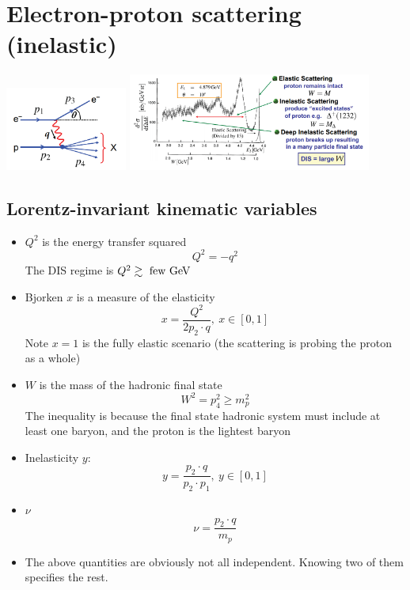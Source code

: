 \section{Electron-proton scattering (inelastic)}
\begin{center}
  \includegraphics[width=0.3\textwidth]{figs/disfeyn.png}
  \includegraphics[width=0.6\textwidth]{figs/epxsec.png}
\end{center}
\subsection{Lorentz-invariant kinematic variables}
\begin{itemize}
  \item $Q^2$ is the energy transfer squared
  \begin{equation}
    Q^2 = -q^2
  \end{equation}
  The DIS regime is $Q^2\gtrsim \text{ few}~\text{GeV}$
  \item Bjorken $x$ is a measure of the elasticity
  \begin{equation}
    x = \frac{Q^2}{2p_2\cdot q}, ~ x\in [0,1]
  \end{equation}
  Note $x=1$ is the fully elastic scenario (the scattering is probing the proton as a whole)
  \item $W$ is the mass of the hadronic final state
  \begin{equation}
    W^2 = p_4^2 \geq m_p^2
  \end{equation}
  The inequality is because the final state hadronic system must include at least one baryon, and the proton is the lightest baryon
  \item Inelasticity $y$:
  \begin{equation}
    y = \frac{p_2\cdot q}{p_2\cdot p_1}, ~ y\in [0,1]
  \end{equation}
  \item $\nu$
  \begin{equation}
    \nu = \frac{p_2\cdot q}{m_p}
  \end{equation}
  \item The above quantities are obviously not all independent. Knowing two of them specifies the rest. 
\end{itemize}

